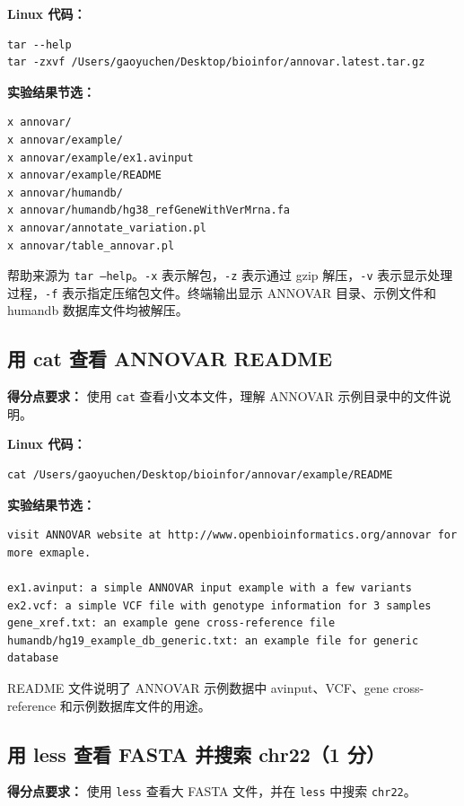 \documentclass[12pt,a4paper,fontset=fandol]{ctexart}
\begin{document}
\noindent\textbf{Linux 代码：}
\begin{lstlisting}[style=linuxcode]
tar --help
tar -zxvf /Users/gaoyuchen/Desktop/bioinfor/annovar.latest.tar.gz
\end{lstlisting}

\noindent\textbf{实验结果节选：}
\begin{lstlisting}[style=resultcode]
x annovar/
x annovar/example/
x annovar/example/ex1.avinput
x annovar/example/README
x annovar/humandb/
x annovar/humandb/hg38_refGeneWithVerMrna.fa
x annovar/annotate_variation.pl
x annovar/table_annovar.pl
\end{lstlisting}

帮助来源为 \texttt{tar --help}。\texttt{-x} 表示解包，\texttt{-z} 表示通过 gzip 解压，\texttt{-v} 表示显示处理过程，\texttt{-f} 表示指定压缩包文件。终端输出显示 ANNOVAR 目录、示例文件和 humandb 数据库文件均被解压。

\subsection{用 cat 查看 ANNOVAR README}

\noindent\textbf{得分点要求：} 使用 \texttt{cat} 查看小文本文件，理解 ANNOVAR 示例目录中的文件说明。

\noindent\textbf{Linux 代码：}
\begin{lstlisting}[style=linuxcode]
cat /Users/gaoyuchen/Desktop/bioinfor/annovar/example/README
\end{lstlisting}

\noindent\textbf{实验结果节选：}
\begin{lstlisting}[style=resultcode]
visit ANNOVAR website at http://www.openbioinformatics.org/annovar for more exmaple.

ex1.avinput: a simple ANNOVAR input example with a few variants
ex2.vcf: a simple VCF file with genotype information for 3 samples
gene_xref.txt: an example gene cross-reference file
humandb/hg19_example_db_generic.txt: an example file for generic database
\end{lstlisting}

README 文件说明了 ANNOVAR 示例数据中 avinput、VCF、gene cross-reference 和示例数据库文件的用途。

\subsection{用 less 查看 FASTA 并搜索 chr22（1 分）}

\noindent\textbf{得分点要求：} 使用 \texttt{less} 查看大 FASTA 文件，并在 \texttt{less} 中搜索 \texttt{chr22}。
\end{document}
